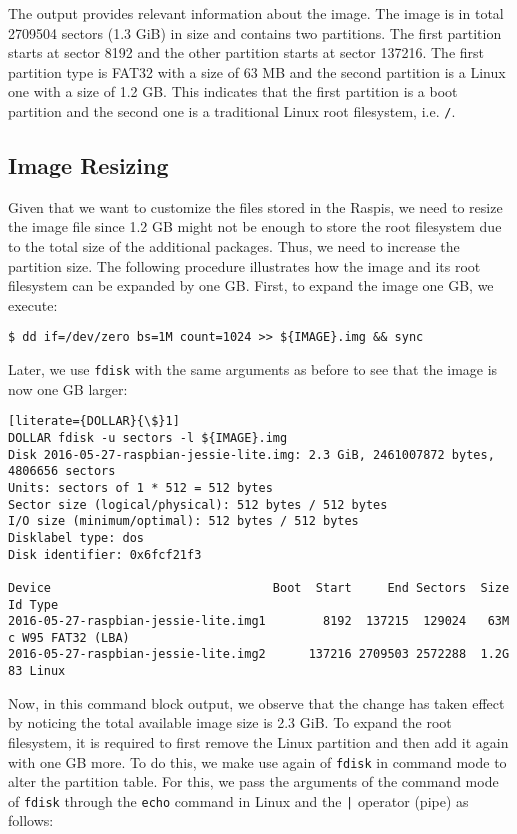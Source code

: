 The output provides relevant information about the image. The image is in
total 2709504 sectors (1.3 GiB) in size and contains two partitions. The
first partition starts at sector 8192 and the other partition starts at
sector 137216. The first partition type is FAT32 with a size of 63 MB
and the second partition is a Linux one with a size of 1.2 GB. This
indicates that the first partition is a boot partition and the second
one is a traditional Linux root filesystem, i.e. \texttt{/}.

\subsection{Image Resizing}
Given that we want to customize the files stored in the \ac{Raspi}s,
we need to resize the image file since 1.2 GB might not be enough to store
the root filesystem due to the total size of the additional packages. Thus,
we need to increase the partition size. The following procedure illustrates
how the image and its root filesystem can be expanded by one GB.
First, to expand the image one GB, we execute:

\begin{lstlisting}[]
$ dd if=/dev/zero bs=1M count=1024 >> ${IMAGE}.img && sync
\end{lstlisting}
\FloatBarrier
\vspace{-5mm}

Later, we use \texttt{fdisk} with the same arguments as before to see that
the image is now one GB larger:
\begin{lstlisting}[literate={DOLLAR}{\$}1]
DOLLAR fdisk -u sectors -l ${IMAGE}.img
Disk 2016-05-27-raspbian-jessie-lite.img: 2.3 GiB, 2461007872 bytes, 4806656 sectors
Units: sectors of 1 * 512 = 512 bytes
Sector size (logical/physical): 512 bytes / 512 bytes
I/O size (minimum/optimal): 512 bytes / 512 bytes
Disklabel type: dos
Disk identifier: 0x6fcf21f3

Device                               Boot  Start     End Sectors  Size Id Type
2016-05-27-raspbian-jessie-lite.img1        8192  137215  129024   63M  c W95 FAT32 (LBA)
2016-05-27-raspbian-jessie-lite.img2      137216 2709503 2572288  1.2G 83 Linux
\end{lstlisting}
\FloatBarrier
\vspace{-5mm}

Now, in this command block output, we observe that the change has taken
effect by noticing the total available image size is 2.3 GiB. To expand the
root filesystem, it is required to first remove the Linux partition
and then add it again with one GB more. To do this, we make use
again of \texttt{fdisk} in command mode to alter the partition table.
For this, we pass the arguments of the command mode of \texttt{fdisk}
through the \texttt{echo} command in Linux and the \texttt{|} operator
(pipe) as follows:

